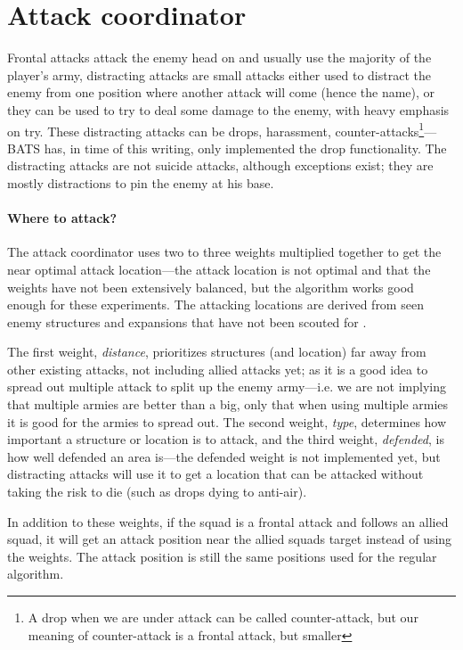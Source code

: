 \section{Attack coordinator}
\label{sec:attack_coordinator}
Frontal attacks attack the enemy head on and usually use the majority of the player’s army, distracting attacks are small attacks either used to distract the enemy from one position where another attack will come (hence the name), or they can be used to try to deal some damage to the enemy, with heavy emphasis on try. These distracting attacks can be drops, harassment, counter-attacks\footnote{A drop when we are under attack can be called counter-attack, but our meaning of counter-attack is a frontal attack, but smaller}—BATS has, in time of this writing, only implemented the drop functionality. The distracting attacks are not suicide attacks, although exceptions exist; they are mostly distractions to pin the enemy at his base.

\paragraph{Where to attack?}
The attack coordinator uses two to three weights multiplied together to get the near optimal attack location—the attack location is not optimal and that the weights have not been extensively balanced, but the algorithm works good enough for these experiments. The attacking locations are derived from seen enemy structures and expansions that have not been scouted for \attackCoordinatorExpansionNotCheckedTime.

The first weight, \emph{distance}, prioritizes structures (and location) far away from other existing attacks, not including allied attacks yet; as it is a good idea to spread out multiple attack to split up the enemy army—i.e. we are not implying that multiple armies are better than a big, only that when using multiple armies it is good for the armies to spread out. The second weight, \emph{type}, determines how important a structure or location is to attack, and the third weight, \emph{defended}, is how well defended an area is—the defended weight is not implemented yet, but distracting attacks will use it to get a location that can be attacked without taking the risk to die (such as drops dying to anti-air).

In addition to these weights, if the squad is a frontal attack and follows an allied squad, it will get an attack position near the allied squads target instead of using the weights. The attack position is still the same positions used for the regular algorithm.

